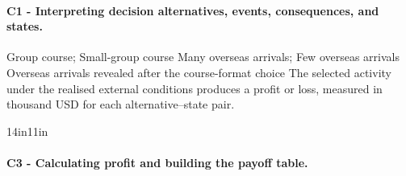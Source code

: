 	\paragraph*{C1 - Interpreting decision alternatives, events, consequences, and states.}
	\DecisionElementsTable
{Group course; Small-group course}
{Many overseas arrivals; Few overseas arrivals}
{Overseas arrivals revealed after the course-format choice}
{The selected activity under the realised external conditions produces a profit or loss, measured in thousand USD for each alternative--state pair.}

	\begin{CalculationLandscape}{14in}{11in}
\setlength{\parskip}{0pt}
\paragraph*{C3 - Calculating profit and building the payoff table.}
\leavevmode\par


\end{CalculationLandscape}
